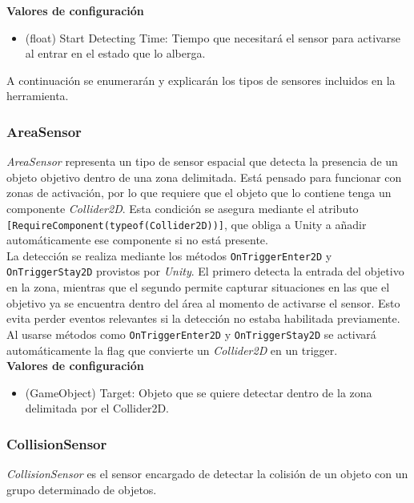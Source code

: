 \textbf{Valores de configuración}
\begin{itemize}
	\item (float) Start Detecting Time: Tiempo que necesitará el sensor para activarse al entrar en el estado que lo alberga.
\end{itemize}


A continuación se enumerarán y explicarán los tipos de sensores incluidos en la herramienta.\\
\subsubsection{AreaSensor}

\textit{AreaSensor} representa un tipo de sensor espacial que detecta la presencia de un objeto objetivo dentro de una zona delimitada. Está pensado para funcionar con zonas de activación, por lo que requiere que el objeto que lo contiene tenga un componente \textit{Collider2D}. Esta condición se asegura mediante el atributo \texttt{[RequireComponent(typeof(Collider2D))]}, que obliga a Unity a añadir automáticamente ese componente si no está presente.\\

La detección se realiza mediante los métodos \texttt{OnTriggerEnter2D} y \texttt{OnTriggerStay2D} provistos por \textit{Unity}. El primero detecta la entrada del objetivo en la zona, mientras que el segundo permite capturar situaciones en las que el objetivo ya se encuentra dentro del área al momento de activarse el sensor. Esto evita perder eventos relevantes si la detección no estaba habilitada previamente.\\

Al usarse métodos como \texttt{OnTriggerEnter2D} y \texttt{OnTriggerStay2D} se activará automáticamente la flag que convierte un \textit{Collider2D} en un trigger.\\

\textbf{Valores de configuración}
\begin{itemize}
	\item (GameObject) Target: Objeto que se quiere detectar dentro de la zona delimitada por el Collider2D.
\end{itemize}

\subsubsection{CollisionSensor}

\textit{CollisionSensor} es el sensor encargado de detectar la colisión de un objeto con un grupo determinado de objetos.\\

